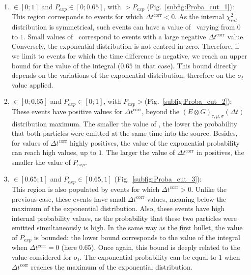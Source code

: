 \begin{enumerate}
\item \Pint$\in[0;1]$ and $P_{exp}\in[0;0.65]$, with \Pint$>P_{exp}$ (Fig.~\ref{subfig:Proba_cut_1}):\\
  This region corresponds to events for which $\Delta t^{\text{corr}}<0$.
  As the internal $\chi^{2}_{int}$ distribution is symmetrical, such events can have a value of \Pint\ varying from $0$ to $1$.
  Small values of \Pint\ correspond to events with a large negative $\Delta t^{\text{corr}}$ value.
  Conversely, the exponential distribution is not centred in zero.
  Therefore, if we limit to events for which the time difference is negative, we reach an upper bound for the value of the integral ($0.65$ in that case).
  This bound directly depends on the variations of the exponential distribution, therefore on the $\sigma_{t}$ value applied.
\item \Pint$\in[0;0.65]$ and $P_{exp}\in[0;1]$, with $P_{exp}>$\Pint (Fig.~\ref{subfig:Proba_cut_2}):\\
  These events have positive values for $\Delta t^{\text{corr}}$, beyond the ${(E \otimes G)_{\tau,\mu,\sigma}(\Delta t)}$ distribution maximum.
  The smaller the value of \Pint, the lower the probability that both particles were emitted at the same time into the source.
  Besides, for values of $\Delta t^{\text{corr}}$ highly positives, the value of the exponential probability can reach high values, up to $1$.
  The larger the value of $\Delta t^{\text{corr}}$ in positives, the smaller the value of $P_{exp}$.
\item \Pint$\in[0.65;1]$ and $P_{exp}\in[0.65,1]$ (Fig.~\ref{subfig:Proba_cut_3}):\\
  This region is also populated by events for which $\Delta t^{\text{corr}}>0$.
  Unlike the previous case, these events have small $\Delta t^{\text{corr}}$ values, meaning below the maximum of the exponential distribution.
  Also, these events have high internal probability values, as the probability that these two particles were emitted simultaneously is high.
  In the same way as the first bullet, the value of $P_{exp}$ is bounded: the lower bound corresponds to the value of the integral when $\Delta t^{\text{corr}}=0$ (here $0.65$).
  Once again, this bound is deeply related to the value considered for $\sigma_{t}$.
  The exponential probability can be equal to $1$ when $\Delta t^{\text{corr}}$ reaches the maximum of the exponential distribution.
\end{enumerate}

